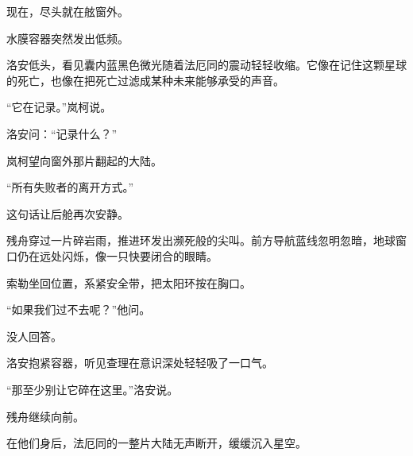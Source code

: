 现在，尽头就在舷窗外。

水膜容器突然发出低频。

洛安低头，看见囊内蓝黑色微光随着法厄同的震动轻轻收缩。它像在记住这颗星球的死亡，也像在把死亡过滤成某种未来能够承受的声音。

“它在记录。”岚柯说。

洛安问：“记录什么？”

岚柯望向窗外那片翻起的大陆。

“所有失败者的离开方式。”

这句话让后舱再次安静。

残舟穿过一片碎岩雨，推进环发出濒死般的尖叫。前方导航蓝线忽明忽暗，地球窗口仍在远处闪烁，像一只快要闭合的眼睛。

索勒坐回位置，系紧安全带，把太阳环按在胸口。

“如果我们过不去呢？”他问。

没人回答。

洛安抱紧容器，听见查理在意识深处轻轻吸了一口气。

“那至少别让它碎在这里。”洛安说。

残舟继续向前。

在他们身后，法厄同的一整片大陆无声断开，缓缓沉入星空。

